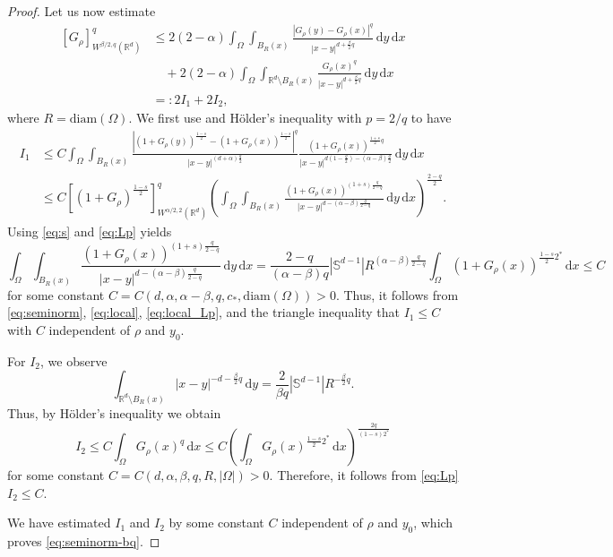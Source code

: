 \documentclass[reqno]{amsart}
\theoremstyle{plain}
\theoremstyle{definition}
\numberwithin{equation}{section}
\newcommand{\Rd}{\mathbb{R}^d}
\newcommand{\dx} {\, \mathrm{d}x}
\newcommand{\dy} {\, \mathrm{d}y}
\newcommand{\cl} {c_{\ast}}
\begin{document}
\begin{proof}
Let us now estimate
\begin{equation*}
\begin{split}
[G_\rho]_{W^{\beta/2, q}(\Rd)}^q 
&\leq 2(2-\alpha)\int_{\Omega} \int_{B_R(x)} \frac{|G_\rho(y) - G_\rho(x)|^q}{|x-y|^{d+\frac{\beta}{2}q}} \dy \dx \\
&\quad + 2(2-\alpha) \int_{\Omega} \int_{\Rd \setminus B_R(x)} \frac{G_\rho(x)^q}{|x-y|^{d+\frac{\beta}{2}q}} \dy \dx \\
&=: 2I_1 + 2I_2,
\end{split}
\end{equation*}
where $R = \mathrm{diam}(\Omega)$. We first use  and H\"older's inequality with $p=2/q$ to have
\begin{equation} \label{eq:local} 
\begin{split}
I_1
&\leq C \int_{\Omega} \int_{B_R(x)} \frac{|(1+G_\rho(y))^{\frac{1-s}{2}} - (1+G_\rho(x))^{\frac{1-s}{2}}|^q}{|x-y|^{(d+\alpha)\frac{q}{2}}} \frac{(1+G_\rho(x))^{\frac{1+s}{2}q}}{|x-y|^{d(1-\frac{q}{2})-(\alpha-\beta)\frac{q}{2}}} \dy \dx \\
&\leq C \left[ (1+G_\rho)^\frac{1-s}{2} \right]_{W^{\alpha/2, 2}(\Rd)}^q \left( \int_{\Omega} \int_{B_R(x)} \frac{(1+G_\rho(x))^{(1+s)\frac{q}{2-q}}}{|x-y|^{d-(\alpha-\beta)\frac{q}{2-q}}} \dy \dx \right)^{\frac{2-q}{2}}.
\end{split}
\end{equation} 
Using \eqref{eq:s} and \eqref{eq:Lp} yields
\begin{equation} \label{eq:local_Lp}
\int_\Omega \int_{B_R(x)} \frac{(1+G_\rho(x))^{(1+s)\frac{q}{2-q}}}{|x-y|^{d-(\alpha-\beta)\frac{q}{2-q}}} \dy \dx = \frac{2-q}{(\alpha-\beta)q} |\mathbb{S}^{d-1}| R^{(\alpha-\beta)\frac{q}{2-q}} \int_\Omega (1+G_\rho(x))^{\frac{1-s}{2}2^{\ast}} \dx \leq C
\end{equation}
for some constant $C = C(d, \alpha, \alpha-\beta, q, \cl, \mathrm{diam}(\Omega)) > 0$. Thus, it follows from \eqref{eq:seminorm}, \eqref{eq:local}, \eqref{eq:local_Lp}, and the triangle inequality that $I_1 \leq C$ with $C$ independent of $\rho$ and $y_0$.

For $I_2$, we observe
\begin{equation*}
\int_{\Rd \setminus B_R(x)} |x-y|^{-d-\frac{\beta}{2}q} \dy = \frac{2}{\beta q}|\mathbb{S}^{d-1}| R^{-\frac{\beta}{2}q}.
\end{equation*}
Thus, by H\"older's inequality we obtain
\begin{equation*}
I_2 \leq C \int_{\Omega} G_{\rho}(x)^q \dx \leq C \left( \int_{\Omega} G_{\rho}(x)^{\frac{1-s}{2}2^{\ast}} \dx \right)^{\frac{2q}{(1-s)2^{\ast}}}
\end{equation*}
for some constant $C = C(d, \alpha, \beta, q, R, |\Omega|) > 0$. Therefore, it follows from \eqref{eq:Lp} $I_2 \leq C$.

We have estimated $I_1$ and $I_2$ by some constant $C$ independent of $\rho$ and $y_0$, which proves \eqref{eq:seminorm-bq}.
\end{proof}
\end{document}
